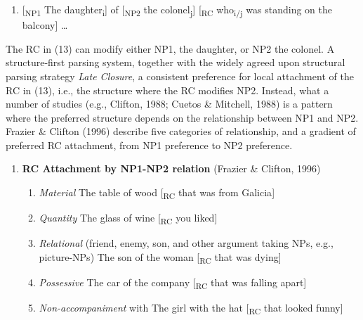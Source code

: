 \documentclass[12pt,oneside]{book}
\providecommand{\tightlist}{%
  \setlength{\itemsep}{0pt}\setlength{\parskip}{0pt}}
\begin{document}
\begin{enumerate}
\def\labelenumi{(\arabic{enumi})}
\setcounter{enumi}{12}
\tightlist
\item
  {[}\textsubscript{NP1} The daughter\textsubscript{i}{]} of {[}\textsubscript{NP2} the colonel\textsubscript{j}{]} {[}\textsubscript{RC} who\textsubscript{i/j} was standing on the balcony{]} \ldots{}
\end{enumerate}

The RC in (13) can modify either NP1, the daughter, or NP2 the colonel. A structure-first parsing system, together with the widely agreed upon structural parsing strategy \emph{Late Closure},  a consistent preference for  local attachment of the RC in (13), i.e., the structure where the RC modifies NP2. Instead, what  a number of  studies (e.g., Clifton, 1988; Cuetos \& Mitchell, 1988)  is a pattern where the preferred structure depends on the relationship between NP1 and NP2. Frazier \& Clifton (1996) describe five categories of relationship, and a gradient of preferred RC attachment, from NP1 preference to NP2 preference.

\begin{enumerate}
\def\labelenumi{(\arabic{enumi})}
\setcounter{enumi}{13}
\tightlist
\item
  \textbf{RC Attachment by NP1-NP2 relation} (Frazier \& Clifton, 1996)

  \begin{enumerate}
  \def\labelenumii{\alph{enumii})}
  \tightlist
  \item
    \emph{Material} \linebreak
    The table of wood {[}\textsubscript{RC} that was from Galicia{]}
  \item
    \emph{Quantity} \linebreak
    The glass of wine {[}\textsubscript{RC} you liked{]}
  \item
    \emph{Relational} (friend, enemy, son, and other argument taking NPs, e.g., picture-NPs) \linebreak
    The son of the woman {[}\textsubscript{RC} that was dying{]}
  \item
    \emph{Possessive} \linebreak
    The car of the company {[}\textsubscript{RC} that was falling apart{]}
  \item
    \emph{Non-accompaniment} with \linebreak
    The girl with the hat {[}\textsubscript{RC} that looked funny{]}
  \end{enumerate}
\end{enumerate}
\end{document}
